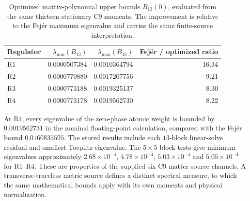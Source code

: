 \begin{table}[ht]
\centering\small
\caption{Optimized matrix-polynomial upper bounds $B_{13}(0)$, evaluated from the same thirteen stationary C9 moments. The improvement is relative to the Fej\'er maximum eigenvalue and carries the same finite-source interpretation.}\label{tab:christoffel-qict}
\begin{tabular}{@{}lrrr@{}}\toprule
Regulator & $\lambda_{\min}(B_{13})$ & $\lambda_{\max}(B_{13})$ & Fej\'er / optimized ratio\\\midrule
R1 & 0.0000507384 & 0.0010364794 & 16.34\\
R2 & 0.0000770880 & 0.0017207756 & 9.21\\
R3 & 0.0000773188 & 0.0019325137 & 8.30\\
R4 & 0.0000773178 & 0.0019562730 & 8.22\\
\bottomrule\end{tabular}
\end{table}

At R4, every eigenvalue of the zero-phase atomic weight is bounded by $0.0019562731$ in the nominal floating-point calculation, compared with the Fej\'er bound $0.0160835595$. The stored results include each $13$-block linear-solve residual and smallest Toeplitz eigenvalue. The $5\times5$ block tests give minimum eigenvalues approximately $2.68\times10^{-4}$, $4.78\times10^{-4}$, $5.03\times10^{-4}$ and $5.05\times10^{-4}$ for R1--R4. These are properties of the supplied six C9 matter-source channels. A transverse-traceless metric source defines a distinct spectral measure, to which the same mathematical bounds apply with its own moments and physical normalization.


